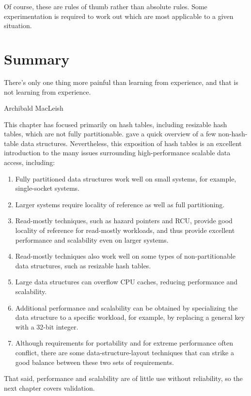 Of course, these are rules of thumb rather than absolute rules.
Some experimentation is required to work out which are most applicable
to a given situation.

\section{Summary}
\label{sec:datastruct:Summary}
%
\epigraph{There's only one thing more painful than learning from
	  experience, and that is not learning from experience.}
	 {Archibald MacLeish}

This chapter has focused primarily on hash tables, including resizable
hash tables, which are not fully partitionable.
 gave a quick
overview of a few non-hash-table data structures.
Nevertheless, this exposition of hash tables is an excellent introduction
to the many issues surrounding high-performance scalable data access,
including:

\begin{enumerate}
\item	Fully partitioned data structures work well on small systems,
	for example, single-socket systems.
\item	Larger systems require locality of reference as well as
	full partitioning.
\item	Read-mostly techniques, such as hazard pointers and RCU,
	provide good locality of reference for read-mostly workloads,
	and thus provide excellent performance and scalability even
	on larger systems.
\item	Read-mostly techniques also work well on some types of
	non-partitionable data structures, such as resizable hash tables.
\item	Large data structures can overflow CPU caches, reducing performance
	and scalability.
\item	Additional performance and scalability can be obtained by
	specializing the data structure to a specific workload,
	for example, by replacing a general key with a 32-bit integer.
\item	Although requirements for portability and for extreme performance
	often conflict, there are some data-structure-layout techniques
	that can strike a good balance between these two sets of
	requirements.
\end{enumerate}

That said, performance and scalability are of little use without reliability,
so the next chapter covers validation.


